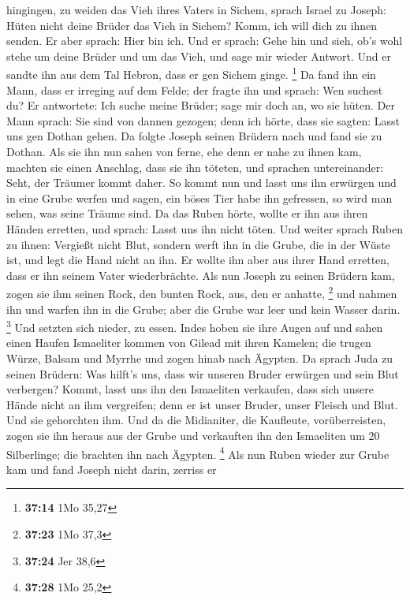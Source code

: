 hingingen, zu weiden das Vieh ihres Vaters in Sichem, 
sprach Israel zu Joseph: Hüten nicht deine Brüder das Vieh in Sichem?
Komm, ich will dich zu ihnen senden. Er aber sprach: Hier bin ich.
 Und er sprach: Gehe hin und sieh, ob's wohl stehe um deine
Brüder und um das Vieh, und sage mir wieder Antwort. Und er sandte ihn
aus dem Tal Hebron, dass er gen Sichem ginge. \footnote{\textbf{37:14}
  1Mo 35,27}  Da fand ihn ein Mann, dass er irreging auf
dem Felde; der fragte ihn und sprach: Wen suchest du?  Er
antwortete: Ich suche meine Brüder; sage mir doch an, wo sie hüten.
 Der Mann sprach: Sie sind von dannen gezogen; denn ich
hörte, dass sie sagten: Lasst uns gen Dothan gehen. Da folgte Joseph
seinen Brüdern nach und fand sie zu Dothan.  Als sie ihn
nun sahen von ferne, ehe denn er nahe zu ihnen kam, machten sie einen
Anschlag, dass sie ihn töteten,  und sprachen
untereinander: Seht, der Träumer kommt daher.  So kommt nun
und lasst uns ihn erwürgen und in eine Grube werfen und sagen, ein böses
Tier habe ihn gefressen, so wird man sehen, was seine Träume sind.
 Da das Ruben hörte, wollte er ihn aus ihren Händen
erretten, und sprach: Lasst uns ihn nicht töten.  Und
weiter sprach Ruben zu ihnen: Vergießt nicht Blut, sondern werft ihn in
die Grube, die in der Wüste ist, und legt die Hand nicht an ihn. Er
wollte ihn aber aus ihrer Hand erretten, dass er ihn seinem Vater
wiederbrächte.  Als nun Joseph zu seinen Brüdern kam, zogen
sie ihm seinen Rock, den bunten Rock, aus, den er anhatte, \footnote{\textbf{37:23}
  1Mo 37,3}  und nahmen ihn und warfen ihn in die Grube;
aber die Grube war leer und kein Wasser darin. \footnote{\textbf{37:24}
  Jer 38,6}  Und setzten sich nieder, zu essen. Indes hoben
sie ihre Augen auf und sahen einen Haufen Ismaeliter kommen von Gilead
mit ihren Kamelen; die trugen Würze, Balsam und Myrrhe und zogen hinab
nach Ägypten.  Da sprach Juda zu seinen Brüdern: Was
hilft's uns, dass wir unseren Bruder erwürgen und sein Blut verbergen?
 Kommt, lasst uns ihn den Ismaeliten verkaufen, dass sich
unsere Hände nicht an ihm vergreifen; denn er ist unser Bruder, unser
Fleisch und Blut. Und sie gehorchten ihm.  Und da die
Midianiter, die Kaufleute, vorüberreisten, zogen sie ihn heraus aus der
Grube und verkauften ihn den Ismaeliten um 20 Silberlinge; die brachten
ihn nach Ägypten. \footnote{\textbf{37:28} 1Mo 25,2}  Als
nun Ruben wieder zur Grube kam und fand Joseph nicht darin, zerriss er

